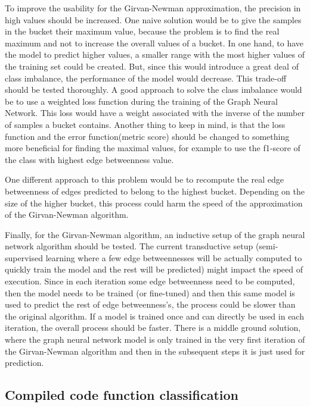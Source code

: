 To improve the usability for the Girvan-Newman approximation, the precision in high values should be increased. One naive solution would be to give the samples in the bucket their maximum value, because the problem is to find the real maximum and not to increase the overall values of a bucket. In one hand, to have the model to predict higher values, a smaller range with the most higher values of the training set could be created. But, since this would introduce a great deal of class imbalance, the performance of the model would decrease. This trade-off should be tested thoroughly. A good approach to solve the class imbalance would be to use a weighted loss function during the training of the Graph Neural Network. This loss would have a weight associated with the inverse of the number of samples a bucket contains. Another thing to keep in mind, is that the loss function and the error function(metric score) should be changed to something more beneficial for finding the maximal values, for example to use the f1-score of the class with highest edge betweenness value.

One different approach to this problem would be to recompute the real edge betweenness of edges predicted to belong to the highest bucket. Depending on the size of the higher bucket, this process could harm the speed of the approximation of the Girvan-Newman algorithm.

Finally, for the Girvan-Newman algorithm, an inductive setup of the graph neural network algorithm should be tested. The current transductive setup (semi-supervised learning where a few edge betweennesses will be actually computed to quickly train the model and the rest will be predicted) might impact the speed of execution. Since in each iteration some edge betweenness need to be computed, then the model needs to be trained (or fine-tuned) and then this same model is used to predict the rest of edge betweenness's, the process could be slower than the original algorithm. If a model is trained once and can directly be used in each iteration, the overall process should be faster. There is a middle ground solution, where the graph neural network model is only trained in the very first iteration of the Girvan-Newman algorithm and then in the subsequent steps it is just used for prediction. 



\newpage
\subsection{Compiled code function classification}



